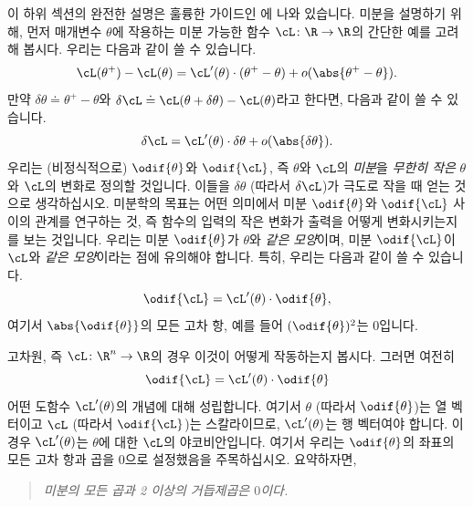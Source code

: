 \documentclass[../../book-main_ko.tex]{subfiles}
\begin{document}
이 하위 섹션의 완전한 설명은 훌륭한 가이드인 \cite{bright2025matrix}에 나와 있습니다. 미분을 설명하기 위해, 먼저 매개변수 \(\theta\)에 작용하는 미분 가능한 함수 \(\cL \colon \R \to \R\)의 간단한 예를 고려해 봅시다. 우리는 다음과 같이 쓸 수 있습니다.
\begin{equation}
    \cL(\theta^{+}) - \cL(\theta) = \cL^{\prime}(\theta)\cdot(\theta^{+} - \theta) + o(\abs{\theta^{+} - \theta}).
\end{equation}
만약 \(\delta\theta \doteq \theta^{+} - \theta\)와 \(\delta\cL \doteq \cL(\theta + \delta\theta) - \cL(\theta)\)라고 한다면, 다음과 같이 쓸 수 있습니다.
\begin{equation}
    \delta\cL = \cL^{\prime}(\theta)\cdot\delta\theta + o(\abs{\delta\theta}).
\end{equation}
우리는 (비정식적으로) \(\odif{\theta}\)와 \(\odif{\cL}\), 즉 \(\theta\)와 \(\cL\)의 \textit{미분}을 \textit{무한히 작은} \(\theta\)와 \(\cL\)의 변화로 정의할 것입니다.
이들을 \(\delta\theta\) (따라서 \(\delta \cL\))가 극도로 작을 때 얻는 것으로 생각하십시오. 미분학의 목표는 어떤 의미에서 미분 \(\odif{\theta}\)와 \(\odif{\cL}\) 사이의 관계를 연구하는 것, 즉 함수의 입력의 작은 변화가 출력을 어떻게 변화시키는지를 보는 것입니다. 우리는 미분 \(\odif{\theta}\)가 \(\theta\)와 \textit{같은 모양}이며, 미분 \(\odif{\cL}\)이 \(\cL\)와 \textit{같은 모양}이라는 점에 유의해야 합니다. 특히, 우리는 다음과 같이 쓸 수 있습니다.
\begin{equation}
    \odif{\cL} = \cL^{\prime}(\theta)\cdot\odif{\theta},
\end{equation}
여기서 \(\abs{\odif{\theta}}\)의 모든 고차 항, 예를 들어 \((\odif{\theta})^{2}\)는 \(0\)입니다.

고차원, 즉 \(\cL \colon \R^{n} \to \R\)의 경우 이것이 어떻게 작동하는지 봅시다. 그러면 여전히
\begin{equation}
    \odif{\cL} = \cL^{\prime}(\theta)\cdot\odif{\theta}
\end{equation}
어떤 도함수 \(\cL^{\prime}(\theta)\)의 개념에 대해 성립합니다. 여기서 \(\theta\) (따라서 \(\odif{\theta}\))는 열 벡터이고 \(\cL\) (따라서 \(\odif{\cL}\))는 스칼라이므로, \(\cL^{\prime}(\theta)\)는 행 벡터여야 합니다. 이 경우 \(\cL^{\prime}(\theta)\)는 \(\theta\)에 대한 \(\cL\)의 야코비안입니다. 여기서 우리는 \(\odif{\theta}\)의 좌표의 모든 고차 항과 곱을 \(0\)으로 설정했음을 주목하십시오. 요약하자면,
\begin{quote}
    \centering
    \textit{미분의 모든 곱과 2 이상의 거듭제곱은 \(0\)이다.}
\end{quote}
\end{document}
